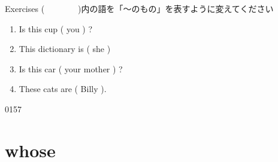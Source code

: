 \documentclass[aspectratio=169,xcolor={dvipsnames,table}]{beamer}
\begin{document}
\begin{frame}[plain]{Exercises}
(~~~~~~~~)内の語を「〜のもの」を表すように変えてください
 \begin{enumerate}
  \item Is this cup ( you ) ?\hfill{}
  \item This dictionary is ( she )\hfill{}
  \item Is this car ( your mother ) ?\hfill{}
  \item These cats are ( Billy ).\hfill{}
 \end{enumerate}

\hfill{\tiny 0157}\,{\scriptsize {}}

\end{frame}
\section{whose }
\end{document}
